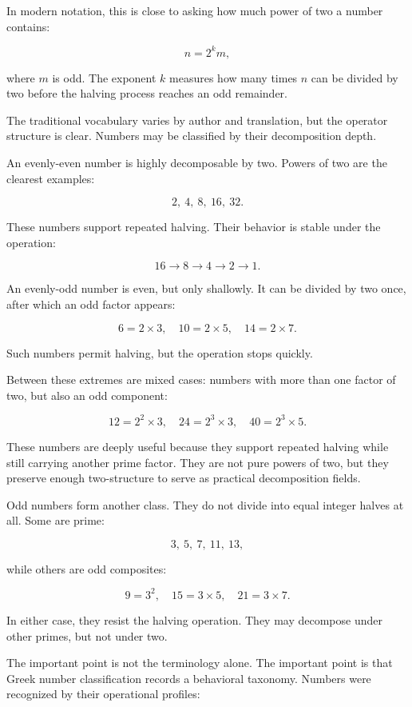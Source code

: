 \documentclass[11pt]{book}
\begin{document}
In modern notation, this is close to asking how much power of two a number contains:

\[
n = 2^k m,
\]

where \(m\) is odd. The exponent \(k\) measures how many times \(n\) can be divided by two before the halving process reaches an odd remainder.

The traditional vocabulary varies by author and translation, but the operator structure is clear.  Numbers may be classified by their decomposition depth.

An evenly-even number is highly decomposable by two. Powers of two are the clearest examples:

\[
2,\ 4,\ 8,\ 16,\ 32.
\]

These numbers support repeated halving. Their behavior is stable under the operation:

\[
16 \rightarrow 8 \rightarrow 4 \rightarrow 2 \rightarrow 1.
\]

An evenly-odd number is even, but only shallowly. It can be divided by two once, after which an odd factor appears:

\[
6 = 2 \times 3,
\quad
10 = 2 \times 5,
\quad
14 = 2 \times 7.
\]

Such numbers permit halving, but the operation stops quickly.

Between these extremes are mixed cases: numbers with more than one factor of two, but also an odd component:

\[
12 = 2^2 \times 3,
\quad
24 = 2^3 \times 3,
\quad
40 = 2^3 \times 5.
\]

These numbers are deeply useful because they support repeated halving while still carrying another prime factor. They are not pure powers of two, but they preserve enough two-structure to serve as practical decomposition fields.

Odd numbers form another class. They do not divide into equal integer halves at all. Some are prime:

\[
3,\ 5,\ 7,\ 11,\ 13,
\]

while others are odd composites:

\[
9 = 3^2,
\quad
15 = 3 \times 5,
\quad
21 = 3 \times 7.
\]

In either case, they resist the halving operation. They may decompose under other primes, but not under two.

The important point is not the terminology alone. The important point is that Greek number classification records a behavioral taxonomy. Numbers were recognized by their operational profiles:
\end{document}
